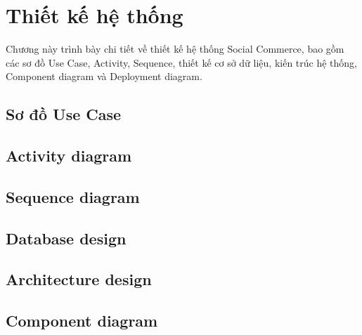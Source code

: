 \chapter{Thiết kế hệ thống}

Chương này trình bày chi tiết về thiết kế hệ thống Social Commerce, bao gồm các sơ đồ Use Case, Activity, Sequence, thiết kế cơ sở dữ liệu, kiến trúc hệ thống, Component diagram và Deployment diagram.

\section{Sơ đồ Use Case}


\section{Activity diagram}


\section{Sequence diagram}


\section{Database design}


\section{Architecture design}


\section{Component diagram}
